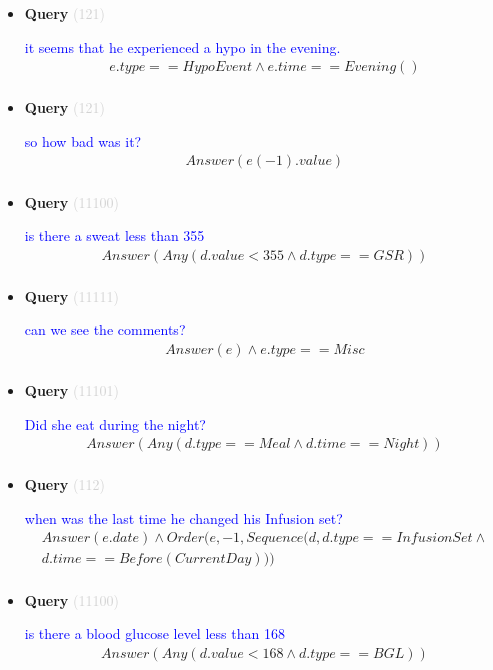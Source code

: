 \documentclass[11pt]{article}
\newcommand{\key}[1]{\textcolor{lightgray}{#1}}
\newcounter{CQuery}
\begin{document}
\begin{itemize}
\item
\textbf{Query\theCQuery} \key{(121)} \addtocounter{CQuery}{1}
\textcolor{blue}{ it seems that he experienced a hypo in the evening. }
\begin{multline*}
e.type==HypoEvent \wedge e.time==Evening() \\ 
\end{multline*}


\item
\textbf{Query\theCQuery} \key{(121)} \addtocounter{CQuery}{1}
\textcolor{blue}{ so how bad was it? }
\begin{multline*}
Answer(e(-1).value) \\ 
\end{multline*}


\item
\textbf{Query\theCQuery} \key{(11100)} \addtocounter{CQuery}{1}
\textcolor{blue}{ is there a sweat less than 355 }
\begin{multline*}
Answer(Any(d.value<355 \wedge d.type==GSR)) \\ 
\end{multline*}


\item
\textbf{Query\theCQuery} \key{(11111)} \addtocounter{CQuery}{1}
\textcolor{blue}{ can we see the comments? }
\begin{multline*}
Answer(e) \wedge e.type==Misc \\ 
\end{multline*}


\item
\textbf{Query\theCQuery} \key{(11101)} \addtocounter{CQuery}{1}
\textcolor{blue}{ Did she eat during the night? }
\begin{multline*}
Answer(Any(d.type==Meal \wedge d.time==Night)) \\ 
\end{multline*}


\item
\textbf{Query\theCQuery} \key{(112)} \addtocounter{CQuery}{1}
\textcolor{blue}{ when was the last time he changed his Infusion set? }
\begin{multline*}
Answer(e.date) \wedge Order(e, -1, Sequence(d, d.type==InfusionSet\wedge \\ 
d.time==Before(CurrentDay))) \\ 
\end{multline*}


\item
\textbf{Query\theCQuery} \key{(11100)} \addtocounter{CQuery}{1}
\textcolor{blue}{ is there a blood glucose level less than 168 }
\begin{multline*}
Answer(Any(d.value<168 \wedge d.type==BGL)) \\ 
\end{multline*}



\end{itemize}
\end{document}
